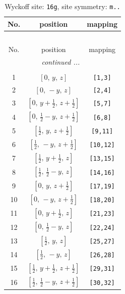 \documentclass[fleqn,8pt]{jsarticle}
\begin{document}
\renewcommand{\arraystretch}{1.2}
\begin{longtable}{ccc}
\caption{Wyckoff site: {\tt 16g}, site symmetry: {\tt m..}}
 \\
 \hline \hline
No. & position & mapping \\ \hline \endfirsthead

\multicolumn{2}{l}{\tablename\ \thetable{}} \\
 \hline \hline
No. & position & mapping \\ \hline \endhead

 \hline \hline
\multicolumn{2}{r}{\footnotesize\it continued ...} \\ \endfoot

 \hline \hline
\multicolumn{2}{r}{} \\ \endlastfoot

1 & $\left[ 0,\, y,\, z \right]$ & {\tt [1,3]} \\ \hline
2 & $\left[ 0,\, - y,\, z \right]$ & {\tt [2,4]} \\ \hline
3 & $\left[ 0,\, y + \frac{1}{2},\, z + \frac{1}{2} \right]$ & {\tt [5,7]} \\ \hline
4 & $\left[ 0,\, \frac{1}{2} - y,\, z + \frac{1}{2} \right]$ & {\tt [6,8]} \\ \hline
5 & $\left[ \frac{1}{2},\, y,\, z + \frac{1}{2} \right]$ & {\tt [9,11]} \\ \hline
6 & $\left[ \frac{1}{2},\, - y,\, z + \frac{1}{2} \right]$ & {\tt [10,12]} \\ \hline
7 & $\left[ \frac{1}{2},\, y + \frac{1}{2},\, z \right]$ & {\tt [13,15]} \\ \hline
8 & $\left[ \frac{1}{2},\, \frac{1}{2} - y,\, z \right]$ & {\tt [14,16]} \\ \hline
9 & $\left[ 0,\, y,\, z + \frac{1}{2} \right]$ & {\tt [17,19]} \\ \hline
10 & $\left[ 0,\, - y,\, z + \frac{1}{2} \right]$ & {\tt [18,20]} \\ \hline
11 & $\left[ 0,\, y + \frac{1}{2},\, z \right]$ & {\tt [21,23]} \\ \hline
12 & $\left[ 0,\, \frac{1}{2} - y,\, z \right]$ & {\tt [22,24]} \\ \hline
13 & $\left[ \frac{1}{2},\, y,\, z \right]$ & {\tt [25,27]} \\ \hline
14 & $\left[ \frac{1}{2},\, - y,\, z \right]$ & {\tt [26,28]} \\ \hline
15 & $\left[ \frac{1}{2},\, y + \frac{1}{2},\, z + \frac{1}{2} \right]$ & {\tt [29,31]} \\ \hline
16 & $\left[ \frac{1}{2},\, \frac{1}{2} - y,\, z + \frac{1}{2} \right]$ & {\tt [30,32]} \\
\end{longtable}
\end{document}
